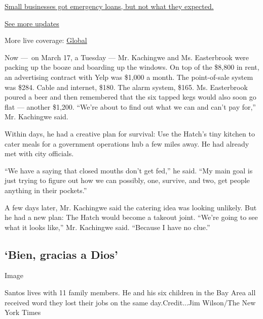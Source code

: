 \href{https://www.nytimes3xbfgragh.onion/live/2020/08/03/business/stock-market-today-coronavirus?action=click\&pgtype=Article\&state=default\&region=MAIN_CONTENT_1\&context=storylines_live_updates\#small-businesses-got-emergency-loans-but-not-what-they-expected}{Small
businesses got emergency loans, but not what they expected.}

\href{https://www.nytimes3xbfgragh.onion/live/2020/08/03/business/stock-market-today-coronavirus?action=click\&pgtype=Article\&state=default\&region=MAIN_CONTENT_1\&context=storylines_live_updates}{See
more updates}

More live coverage:
\href{https://www.nytimes3xbfgragh.onion/2020/08/03/world/coronavirus-covid-19.html?action=click\&pgtype=Article\&state=default\&region=MAIN_CONTENT_1\&context=storylines_live_updates}{Global}

Now ---~on March 17, a Tuesday --- Mr. Kachingwe and Ms. Easterbrook
were packing up the booze and boarding up the windows. On top of the
\$8,800 in rent, an advertising contract with Yelp was \$1,000 a month.
The point-of-sale system was \$284. Cable and internet, \$180. The alarm
system, \$165. Ms. Easterbrook poured a beer and then remembered that
the six tapped kegs would also soon go flat --- another \$1,200. ``We're
about to find out what we can and can't pay for,'' Mr. Kachingwe said.

Within days, he had a creative plan for survival: Use the Hatch's tiny
kitchen to cater meals for a government operations hub a few miles away.
He had already met with city officials.

``We have a saying that closed mouths don't get fed,'' he said. ``My
main goal is just trying to figure out how we can possibly, one,
survive, and two, get people anything in their pockets.''

A few days later, Mr. Kachingwe said the catering idea was looking
unlikely. But he had a new plan: The Hatch would become a takeout joint.
``We're going to see what it looks like,'' Mr. Kachingwe said. ``Because
I have no clue.''

\hypertarget{bien-gracias-a-dios}{%
\subsection{`Bien, gracias a Dios'}\label{bien-gracias-a-dios}}

Image

Santos lives with 11 family members. He and his six children in the Bay
Area all received word they lost their jobs on the same day.Credit...Jim
Wilson/The New York Times

